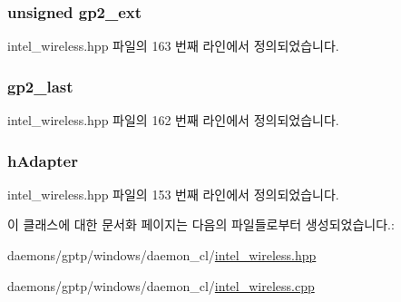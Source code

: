 \subsubsection[{\texorpdfstring{gp2\+\_\+ext}{gp2_ext}}]{\setlength{\rightskip}{0pt plus 5cm}unsigned gp2\+\_\+ext\hspace{0.3cm}{\ttfamily [private]}}\hypertarget{class_intel_wireless_adapter_a93125aa51356104c4ce2f8842251d733}{}\label{class_intel_wireless_adapter_a93125aa51356104c4ce2f8842251d733}


intel\+\_\+wireless.\+hpp 파일의 163 번째 라인에서 정의되었습니다.

\subsubsection[{\texorpdfstring{gp2\+\_\+last}{gp2_last}}]{ gp2\+\_\+last\hspace{0.3cm}{\ttfamily [private]}}\hypertarget{class_intel_wireless_adapter_aca863ce22ff3c9a0f9e9c2d9ac54459d}{}\label{class_intel_wireless_adapter_aca863ce22ff3c9a0f9e9c2d9ac54459d}


intel\+\_\+wireless.\+hpp 파일의 162 번째 라인에서 정의되었습니다.

\subsubsection[{\texorpdfstring{h\+Adapter}{hAdapter}}]{ h\+Adapter\hspace{0.3cm}{\ttfamily [private]}}\hypertarget{class_intel_wireless_adapter_a691881600d67a63fef617bf58a70736c}{}\label{class_intel_wireless_adapter_a691881600d67a63fef617bf58a70736c}


intel\+\_\+wireless.\+hpp 파일의 153 번째 라인에서 정의되었습니다.



이 클래스에 대한 문서화 페이지는 다음의 파일들로부터 생성되었습니다.\+:\begin{DoxyCompactItemize}
\item 
daemons/gptp/windows/daemon\+\_\+cl/\hyperlink{intel__wireless_8hpp}{intel\+\_\+wireless.\+hpp}\item 
daemons/gptp/windows/daemon\+\_\+cl/\hyperlink{intel__wireless_8cpp}{intel\+\_\+wireless.\+cpp}\end{DoxyCompactItemize}

